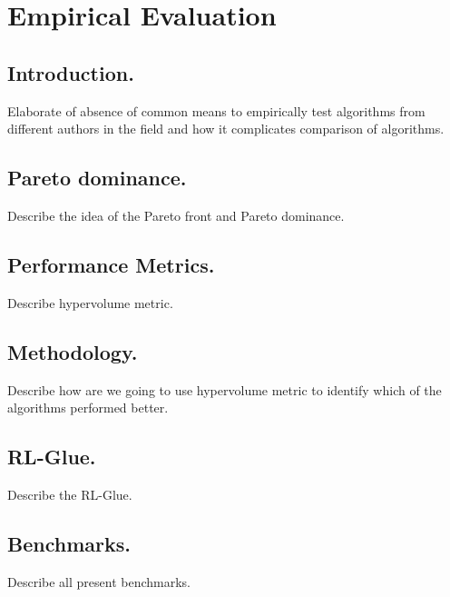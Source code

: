 \chapter{Empirical Evaluation}

\section{Introduction.}

Elaborate of absence of common means to empirically test algorithms from different authors in the field and how it complicates comparison of algorithms.

\section{Pareto dominance.}

Describe the idea of the Pareto front and Pareto dominance.

\section{Performance Metrics.}

Describe hypervolume metric.

\section{Methodology.}

Describe how are we going to use hypervolume metric to identify which of the algorithms performed better. 

\section{RL-Glue.}

Describe the RL-Glue.

\section{Benchmarks.}

Describe all present benchmarks.